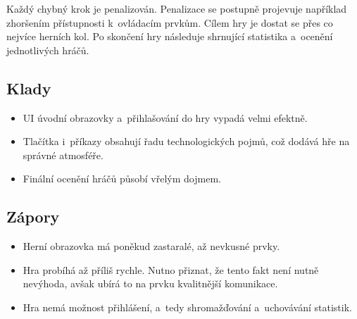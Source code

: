 \pagebreak
Každý chybný krok je penalizován.
Penalizace se postupně projevuje \linebreak například zhoršením přístupnosti
k~ovládacím prvkům.
Cílem hry je dostat se přes co nejvíce herních kol.
Po skončení hry následuje shrnující statistika a~ocenění jednotlivých hráčů.

\subsection*{Klady}

\begin{itemize}
    \item UI úvodní obrazovky a~přihlašování do hry vypadá velmi efektně.
    \item Tlačítka i~příkazy obsahují řadu technologických pojmů,
    což dodává hře na správné atmosféře.
    \item Finální ocenění hráčů působí vřelým dojmem.
\end{itemize}

\subsection*{Zápory}

\begin{itemize}
    \item Herní obrazovka má poněkud zastaralé, až nevkusné prvky.
    \item Hra probíhá až příliš rychle.
    Nutno přiznat, že tento fakt není nutně nevýhoda,
    avšak ubírá to na prvku kvalitnější komunikace.
    \item Hra nemá možnost přihlášení,
    a~tedy shromažďování a~uchovávání statistik.
\end{itemize}
